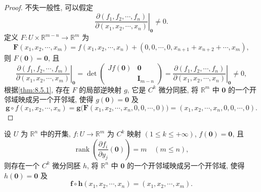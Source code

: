 \begin{proof}
不失一般性, 可以假定
\[
  \left.\frac{\partial(f_{1}, f_{2}, \cdots, f_{n})}{\partial(x_{1}, x_{2}, \cdots, x_{n})}\right|_{\boldsymbol{0}} \neq 0.
\]
定义 $F: U \times \mathbb{R}^{m-n} \to \mathbb{R}^{m}$ 为
\[
  \boldsymbol{F}(x_{1}, x_{2}, \cdots, x_{m}) = f(x_{1}, x_{2}, \cdots, x_{n}) + (0, 0, \cdots, 0, x_{n+1} + x_{n+2} + \cdots, x_{m}),
\]
则 $F(\boldsymbol{0}) = \boldsymbol{0}$, 且
\[
  \left.\frac{\partial(f_{1}, f_{2}, \cdots, f_{m})}{\partial(x_{1}, x_{2}, \cdots, x_{m})}\right|_{\boldsymbol{0}} = \det\begin{pmatrix}
    Jf(\boldsymbol{0}) & \boldsymbol{0} \\
    & \boldsymbol{I}_{m-n}
  \end{pmatrix} = \left.\frac{\partial(f_{1}, f_{2}, \cdots, f_{n})}{\partial(x_{1}, x_{2}, \cdots, x_{n})}\right|_{\boldsymbol{0}} \neq 0,
\]
根据\cref{thm:8.5.1}, 存在 $F$ 的局部逆映射 $g$, 它是 $C^{k}$ 微分同胚, 将 $\mathbb{R}^{m}$ 中 $\boldsymbol{0}$ 的一个开邻域映成另一个开邻域, 使得 $g(\boldsymbol{0}) = \boldsymbol{0}$ 及
\[
  \boldsymbol{g} \circ f(x_{1}, x_{2}, \cdots, x_{n}) = \boldsymbol{g}\bigl(\boldsymbol{F}(x_{1}, x_{2}, \cdots, x_{n}, 0, 0, \cdots, 0)\bigr) = (x_{1}, x_{2}, \cdots, x_{n}, 0, 0, \cdots, 0).
\]
\end{proof}

\begin{corollary}\label{cor:8.5.2}
设 $U$ 为 $\mathbb{R}^{n}$ 中的开集, $f: U \to \mathbb{R}^{m}$ 为 $C^{k}$ 映射 $(1 \leqslant k \leqslant +\infty)$, $f(\boldsymbol{0}) = \boldsymbol{0}$, 且
\[
  \operatorname{rank}\left(\frac{\partial f_{i}}{\partial y_{j}}(\boldsymbol{0})\right) = m \quad (m \leqslant n),
\]
则存在一个 $C^{k}$ 微分同胚 $h$, 将 $\mathbb{R}^{n}$ 中 $\boldsymbol{0}$ 的一个开邻域映成另一个开邻域, 使得 $h(\boldsymbol{0}) = \boldsymbol{0}$ 及
\[
  \boldsymbol{f} \circ \boldsymbol{h}(x_{1}, x_{2}, \cdots, x_{n}) = (x_{1}, x_{2}, \cdots, x_{m}).
\]
\end{corollary}


